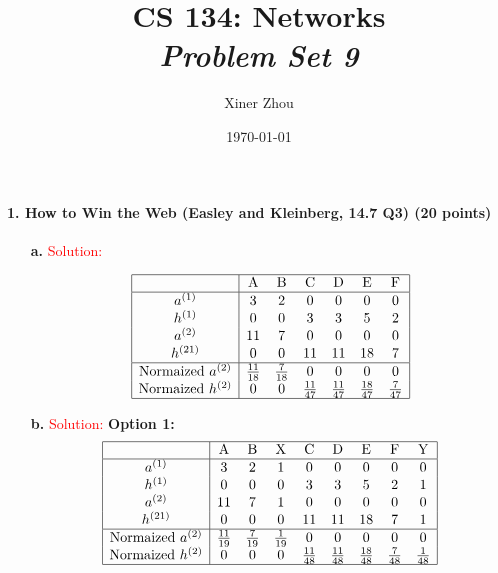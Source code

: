 \documentclass[11pt]{article} %
\title{CS 134: Networks \\ \emph{Problem Set 9}}
\author{Xiner Zhou}
\date{\today} %
\begin{document}
 
\maketitle

 \paragraph{1. How to Win the Web  (Easley and Kleinberg, 14.7 Q3) (20 points)}
 
\begin{itemize}
\item[\textbf{a. }] \textcolor{red}{Solution:}

$$\begin{array} {|c | c c c c c c|} \hline
 & \text{A} & \text{B} & \text {C} & \text {D} & \text {E} & \text{F}  \\ \hline
a^{(1)} & 3 & 2 &  0 & 0 & 0 & 0 \\ 
h^{(1)} & 0 & 0 &  3 & 3 & 5 & 2  \\  
a^{(2)} & 11 & 7 &  0 & 0 & 0 & 0  \\  
h^{(21)} & 0 & 0 &  11 & 11 & 18 & 7  \\ \hline
\text{Normaized} \ a^{(2)} & \frac{11}{18} & \frac{7}{18}  &  0 & 0 & 0 & 0 \\  
\text{Normaized} \  h^{(2)}  & 0 & 0 & \frac{11}{47}  & \frac{11}{47} & \frac{18}{47}  & \frac{7}{47} \\ \hline
\end{array}$$

\item[\textbf{b. }]  \textcolor{red}{Solution:}
\textbf{Option 1:}
$$\begin{array} {|c | c c c c c c c c|} \hline
 & \text{A} & \text{B} & \text{X} & \text {C} & \text {D} & \text {E} & \text{F}  & \text{Y}\\ \hline
a^{(1)} & 3 & 2 & 1 &  0 & 0 & 0 & 0 & 0\\ 
h^{(1)} & 0 & 0 &  0 & 3 & 3 & 5 & 2 & 1 \\  
a^{(2)} & 11 & 7 & 1 & 0 & 0 & 0 & 0  & 0\\  
h^{(21)} & 0 & 0 & 0 &  11 & 11 & 18 & 7 & 1  \\ \hline
\text{Normaized} \ a^{(2)} & \frac{11}{19}  & \frac{7}{19}    & \frac{1}{19}   &  0 & 0 & 0 & 0 & 0 \\  
\text{Normaized} \  h^{(2)}  & 0 & 0  & 0 & \frac{11}{48}   & \frac{11}{48}  & \frac{18}{48} & \frac{7}{48}   & \frac{1}{48}  \\ \hline
\end{array}$$


\end{itemize}
\end{document}
